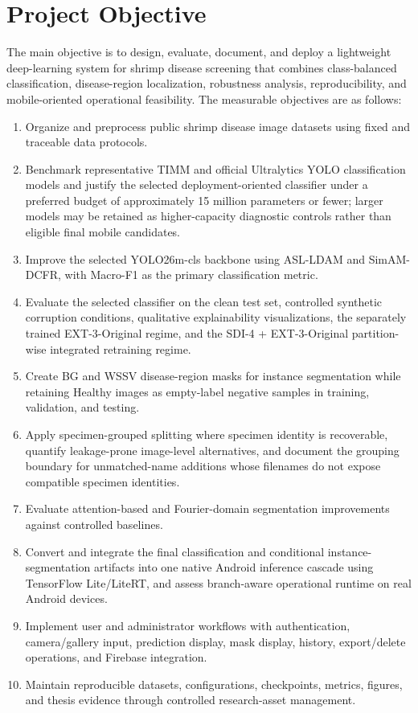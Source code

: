 \documentclass[12pt,a4paper]{report}
\newenvironment{revisionblock}{\begin{snugshade}\noindent}{\end{snugshade}}
\begin{document}
\section{\texorpdfstring{\colorbox{RevisionYellow}{Project Objective}}{Project Objective}}
\begin{revisionblock}
The main objective is to design, evaluate, document, and deploy a lightweight deep-learning system for shrimp disease screening that combines class-balanced classification, disease-region localization, robustness analysis, reproducibility, and mobile-oriented operational feasibility. The measurable objectives are as follows:
\end{revisionblock}
\begin{enumerate}
\item Organize and preprocess public shrimp disease image datasets using fixed and traceable data protocols.
\item \colorbox{RevisionYellow}{\parbox{0.91\linewidth}{Benchmark representative TIMM and official Ultralytics YOLO classification models and justify the selected deployment-oriented classifier under a preferred budget of approximately 15 million parameters or fewer; larger models may be retained as higher-capacity diagnostic controls rather than eligible final mobile candidates.}}
\item \colorbox{RevisionYellow}{\parbox{0.91\linewidth}{Improve the selected YOLO26m-cls backbone using ASL-LDAM and SimAM-DCFR, with Macro-F1 as the primary classification metric.}}
\item Evaluate the selected classifier on the clean test set, controlled synthetic corruption conditions, qualitative explainability visualizations, the separately trained EXT-3-Original regime, and the SDI-4 + EXT-3-Original partition-wise integrated retraining regime.
\item Create BG and WSSV disease-region masks for instance segmentation while retaining Healthy images as empty-label negative samples in training, validation, and testing.
\item \colorbox{RevisionYellow}{\parbox{0.91\linewidth}{Apply specimen-grouped splitting where specimen identity is recoverable, quantify leakage-prone image-level alternatives, and document the grouping boundary for unmatched-name additions whose filenames do not expose compatible specimen identities.}}
\item Evaluate attention-based and Fourier-domain segmentation improvements against controlled baselines.
\item \colorbox{RevisionYellow}{\parbox{0.91\linewidth}{Convert and integrate the final classification and conditional instance-segmentation artifacts into one native Android inference cascade using TensorFlow Lite/LiteRT, and assess branch-aware operational runtime on real Android devices.}}
\item Implement user and administrator workflows with authentication, camera/gallery input, prediction display, mask display, history, export/delete operations, and Firebase integration.
\item Maintain reproducible datasets, configurations, checkpoints, metrics, figures, and thesis evidence through controlled research-asset management.
\end{enumerate}
\end{document}
